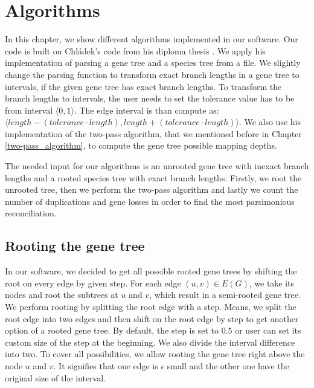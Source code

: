 \chapter{Algorithms}

In this chapter, we show different algorithms implemented in our software. Our code is built on Chládek's code from his diploma thesis \cite{chladek_thesis}. We apply his implementation of parsing a gene tree and a species tree from a file. We slightly change the parsing function to transform exact branch lengths in a gene tree to intervals, if the given gene tree has exact branch lengths. To transform the branch lengths to intervals, the user needs to set the tolerance value has to be from interval $\langle 0, 1 \rangle$. The edge interval is than compute as: $\langle length - (tolerance \cdot length), length + (tolerance \cdot length) \rangle$. We also use his implementation of the two-pass algorithm, that we mentioned before in Chapter \ref{two-pass_algorithm}, to compute the gene tree possible mapping depths.


The needed input for our algorithms is an unrooted gene tree with inexact branch lengths and a rooted species tree with exact branch lengths. Firstly, we root the unrooted tree, then we perform the two-pass algorithm \cite{chladek_thesis} and lastly we count the number of duplications and gene losses in order to find the most parsimonious reconciliation.

\section{Rooting the gene tree}

In our software, we decided to get all possible rooted gene trees by shifting the root on every edge by given step. For each edge $(u, v) \in E(G)$, we take its nodes and root the subtrees at $u$ and $v$, which result in a semi-rooted gene tree. We perform rooting by splitting the root edge with a step. Means, we split the root edge into two edges and then shift on the root edge by step to get another option of a rooted gene tree. By default, the step is set to $0.5$ or user can set its custom size of the step at the beginning. We also divide the interval difference into two. To cover all possibilities, we allow rooting the gene tree right above the node $u$ and $v$. It signifies that one edge is $\epsilon$ small and the other one have the original size of the interval.

